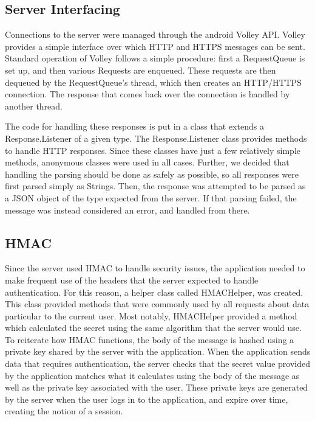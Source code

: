 \documentclass[12pt]{report}
\let\Oldsubsection\subsection
\renewcommand{\subsection}{\FloatBarrier\Oldsubsection}
\begin{document}

\subsection{Server Interfacing} \label{server-interfacing}

Connections to the server were managed through the android Volley API. Volley provides a simple interface over which
HTTP and HTTPS messages can be sent. Standard operation of Volley follows a simple procedure: first a RequestQueue is
set up, and then various Requests are enqueued. These requests are then dequeued by the RequestQueue's thread, which
then creates an HTTP/HTTPS connection. The response that comes back over the connection is handled by another thread.

The code for handling these responses is put in a class that extends a Response.Listener of a given type. The
Response.Listener class provides methods to handle HTTP responses. Since these classes have just a few relatively simple
methods, anonymous classes were used in all cases. Further, we decided that handling the parsing should be done as
safely as possible, so all responses were first parsed simply as Strings. Then, the response was attempted to be parsed
as a JSON object of the type expected from the server. If that parsing failed, the message was instead considered an
error, and handled from there.


\subsection{HMAC} \label{hmac}

Since the server used HMAC to handle security issues, the application needed to make frequent use of the headers that
the server expected to handle authentication. For this reason, a helper class called HMACHelper, was created. This
class provided methods that were commonly used by all requests about data particular to the current user. Most notably,
HMACHelper provided a method which calculated the secret using the same algorithm that the server would use. To
reiterate how HMAC functions, the body of the message is hashed using a private key shared by the server with the
application. When the application sends data that requires authentication, the server checks that the secret value
provided by the application matches what it calculates using the body of the message as well as the private key
associated with the user. These private keys are generated by the server when the user logs in to the application,
and expire over time, creating the notion of a session.
\end{document}
